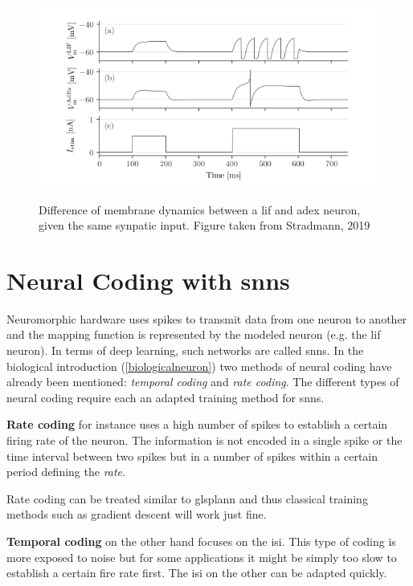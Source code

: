 \begin{figure}
	\includegraphics[width=\linewidth]{figures/LIFvsAdEx.png}
	\label{lifvsadex}
	\caption{Difference of membrane dynamics between a \gls{lif} and \gls{adex} neuron, given the same synpatic input. Figure taken from Stradmann, 2019}
\end{figure}



\section{Neural Coding with \glspl{snn}}
\label{neuralcoding}
Neuromorphic hardware uses spikes to transmit data from one neuron to another and the mapping function is represented by the modeled neuron (e.g. the \gls{lif} neuron). In terms of deep learning, such networks are called \glspl{snn}. In the biological introduction (\cref{biologicalneuron}) two methods of neural coding have already been mentioned: \emph{temporal coding} and \emph{rate coding}. The different types of neural coding require each an adapted training method for \glspl{snn}.

\textbf{Rate coding} for instance uses a high number of spikes to establish a certain firing rate of the neuron. The information is not encoded in a single spike or the time interval between two spikes but in a number of spikes within a certain period defining the \textit{rate}. 

Rate coding can be treated similar to glspl{ann} and thus classical training methods such as gradient descent will work just fine. 

\textbf{Temporal coding} on the other hand focuses on the \gls{isi}. This type of coding is more exposed to noise but for some applications it might be simply too slow to establish a certain fire rate first. The \gls{isi} on the other can be adapted quickly. 

